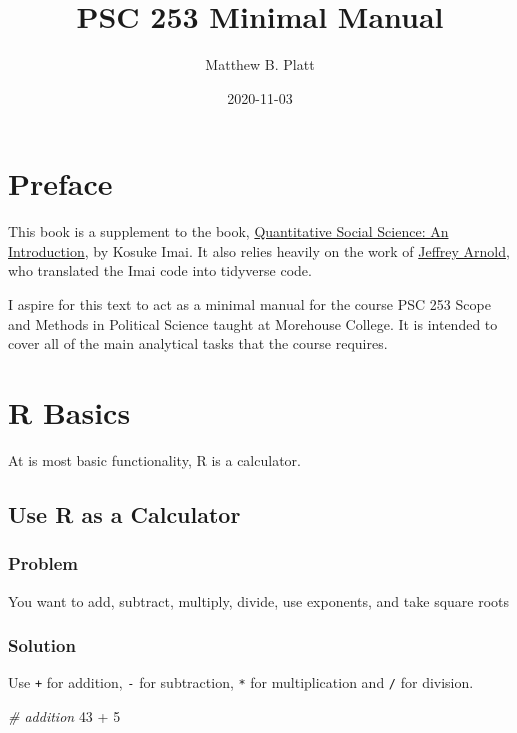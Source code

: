 \documentclass[]{book}
\title{PSC 253 Minimal Manual}
\author{Matthew B. Platt}
\date{2020-11-03}
\newenvironment{Shaded}{\begin{snugshade}}{\end{snugshade}}
\newcommand{\DecValTok}[1]{\textcolor[rgb]{0.00,0.00,0.81}{{#1}}}
\newcommand{\StringTok}[1]{\textcolor[rgb]{0.31,0.60,0.02}{{#1}}}
\newcommand{\CommentTok}[1]{\textcolor[rgb]{0.56,0.35,0.01}{\textit{{#1}}}}
\newcommand{\NormalTok}[1]{{#1}}
\begin{document}
\maketitle

{
\setcounter{tocdepth}{1}
\tableofcontents
}
\chapter*{Preface}\label{preface}

This book is a supplement to the book,
\href{http://qss.princeton.press/}{Quantitative Social Science: An
Introduction}, by Kosuke Imai. It also relies heavily on the work of
\href{https://jrnold.github.io/qss-tidy/}{Jeffrey Arnold}, who
translated the Imai code into tidyverse code.

I aspire for this text to act as a minimal manual for the course PSC 253
Scope and Methods in Political Science taught at Morehouse College. It
is intended to cover all of the main analytical tasks that the course
requires.

\chapter{R Basics}\label{basic}

At is most basic functionality, R is a calculator.

\section{Use R as a Calculator}\label{calculate}

\subsection{Problem}\label{problem}

You want to add, subtract, multiply, divide, use exponents, and take
square roots

\subsection{Solution}\label{solution}

Use \texttt{+} for addition, \texttt{-} for subtraction, \texttt{*} for
multiplication and \texttt{/} for division.

\begin{Shaded}
\begin{Highlighting}[]
\CommentTok{# addition}
\DecValTok{43} \NormalTok{+}\StringTok{ }\DecValTok{5}
\end{Highlighting}
\end{Shaded}
\end{document}
